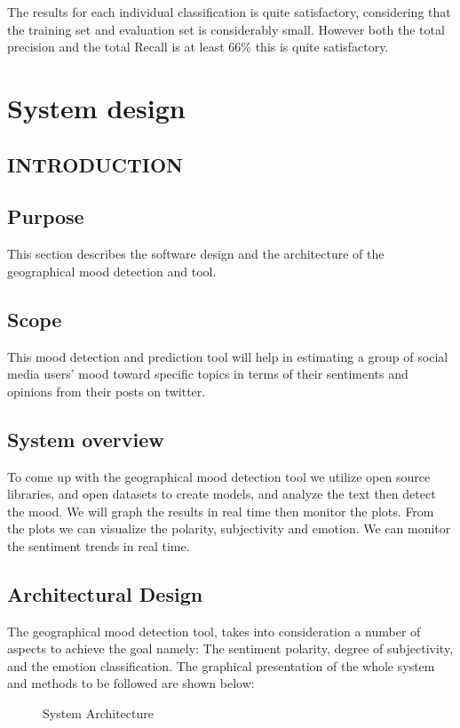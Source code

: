 The results for each individual classification is quite satisfactory, considering that the training set and evaluation set is considerably small. However both the total precision and the total Recall is at least 66\% this is quite satisfactory.


\section{System design}
\subsection{INTRODUCTION}
\subsection{Purpose}
This section describes the software design and the architecture of the geographical mood detection and tool.
\subsection{Scope}
This mood detection and prediction tool will help in estimating a group of social media users'
mood toward specific topics in terms of their sentiments and opinions from their posts on twitter.\\

\subsection{System overview}
To come up with the geographical mood detection tool we utilize open source libraries, and open datasets to create models, and analyze the text then detect the mood. We will graph the results in real time then monitor the plots. From the plots we can visualize the polarity, subjectivity and emotion. We can monitor the sentiment trends in real time.

\subsection{Architectural Design}
The geographical mood detection tool, takes into consideration a number of aspects to achieve the goal namely: The sentiment polarity, degree of subjectivity, and the emotion classification. The graphical presentation of the whole system and methods to be followed are shown below:

\begin{figure}[h]
  \centering
  \caption[System Architecture]%
  {System Architecture}
  \label{fig:ALAP:sm1}
\end{figure}


